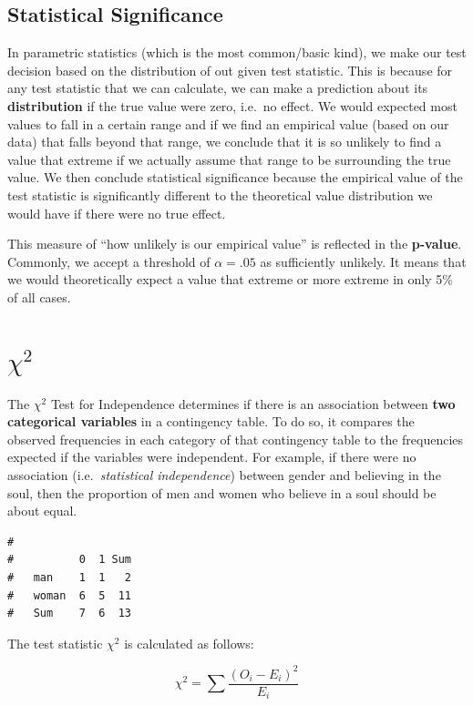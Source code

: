\documentclass[
]{book}
\begin{document}
\subsection{Statistical Significance}\label{statistical-significance}

In parametric statistics (which is the most common/basic kind), we make our test decision based on the distribution of out given test statistic.
This is because for any test statistic that we can calculate, we can make a prediction about its \textbf{distribution} if the true value were zero, i.e.~no effect.
We would expected most values to fall in a certain range and if we find an empirical value (based on our data) that falls beyond that range, we conclude that it is so unlikely to find a value that extreme if we actually assume that range to be surrounding the true value.
We then conclude statistical significance because the empirical value of the test statistic is significantly different to the theoretical value distribution we would have if there were no true effect.

This measure of ``how unlikely is our empirical value'' is reflected in the \textbf{p-value}.
Commonly, we accept a threshold of \(\alpha = .05\) as sufficiently unlikely.
It means that we would theoretically expect a value that extreme or more extreme in only 5\% of all cases.

\section{\texorpdfstring{\(\chi^2\)}{\textbackslash chi\^{}2}}\label{chi2}

The \(\chi^2\) Test for Independence determines if there is an association between \textbf{two categorical variables} in a contingency table.
To do so, it compares the observed frequencies in each category of that contingency table to the frequencies expected if the variables were independent.
For example, if there were no association (i.e.~\emph{statistical independence}) between gender and believing in the soul, then the proportion of men and women who believe in a soul should be about equal.

\begin{verbatim}
#        
#          0  1 Sum
#   man    1  1   2
#   woman  6  5  11
#   Sum    7  6  13
\end{verbatim}

The test statistic \(\chi^2\) is calculated as follows:

\[\chi^2 = \sum \frac{(O_i - E_i)^2}{E_i}\]
\end{document}
